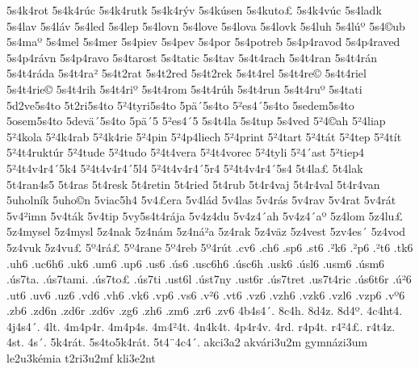 {5s4k4rot
5s4k4r^^fac
5s4k4rutk
5s4k4r^^fdv
5s4k^^fasen
5s4kuto^^a3
5s4k4v^^fac
5s4ladk
5s4lav
5s4l^^e1v
5s4led
5s4lep
5s4lovn
5s4love
5s4lova
5s4lovk
5s4luh
5s4l^^fa^^ba
5s4^^a9ub
5s4ma^^ba
5s4mel
5s4mer
5s4piev
5s4pev
5s4por
5s4potreb
5s4p4ravod
5s4p4raved
5s4p4r^^e1vn
5s4p4ravo
5s4tarost
5s4tatic
5s4tav
5s4t4rach
5s4t4ran
5s4t4r^^e1n
5s4t4r^^e1da
5s4t4ra^^b2
5s4t2rat
5s4t2red
5s4t2rek
5s4t4rel
5s4t4re^^a9
5s4t4riel
5s4t4rie^^a9
5s4t4rih
5s4t4ri^^ba
5s4t4rom
5s4t4r^^fah
5s4t4run
5s4t4ru^^ba
5s4tati
5d2ve5s4to
5t2ri5s4to
5^^b24tyri5s4to
5p^^e4^^b45s4to
5^^b2es4^^b45s4to
5sedem5s4to
5osem5s4to
5dev^^e4^^b45s4to
5p^^e4^^b45
5^^b2es4^^b45
5s4t4la
5s4tup
5s4ved
5^^b24^^a9ah
5^^b24liap
5^^b24kola
5^^b24k4rab
5^^b24k4rie
5^^b24pin
5^^b24p4liech
5^^b24print
5^^b24tart
5^^b24t^^e1t
5^^b24tep
5^^b24t^^edt
5^^b24t4rukt^^far
5^^b24tude
5^^b24tudo
5^^b24t4vera
5^^b24t4vorec
5^^b24tyli
5^^b24^^b4ast
5^^b2tiep4
5^^b24t4v4r4^^b45k4
5^^b24t4v4r4^^b45l4
5^^b24t4v4r4^^b45r4
5^^b24t4v4r4^^b45s4
5t4la^^a3
5t4lak
5t4ran4s5
5t4ras
5t4resk
5t4retin
5t4ried
5t4rub
5t4r4vaj
5t4r4val
5t4r4van
5uholn^^edk
5uho^^a9n
5viac5h4
5v4^^a3era
5v4l^^e1d
5v4las
5v4r^^e1s
5v4rav
5v4rat
5v4r^^e1t
5v4^^b2imn
5v4t^^e1k
5v4tip
5vy5s4t4r^^e1ja
5v4z4du
5v4z4^^b4ah
5v4z4^^b4a^^ba
5z4lom
5z4lu^^a3
5z4mysel
5z4mysl
5z4nak
5z4n^^e1m
5z4n^^e1^^b2a
5z4rak
5z4v^^e4z
5z4vest
5zv4es^^b4
5z4vod
5z4vuk
5z4vu^^a3
5^^ba4r^^e1^^a3
5^^ba4rane
5^^ba4reb
5^^ba4r^^fat
.cv6
.ch6
.sp6
.st6
.^^b2k6
.^^b2p6
.^^b2t6
.tk6
.uh6
.uc6h6
.uk6
.um6
.up6
.us6
.^^fas6
.usc6h6
.^^fasc6h
.usk6
.^^fasl6
.usm6
.^^fasm6
.^^fas7ta.
.^^fas7tami.
.^^fas7to^^a3
.^^fas7ti
.ust6l
.^^fast7ny
.ust6r
.^^fas7tret
.us7t4ric
.^^fas6t6r
.^^fa^^b26
.ut6
.uv6
.uz6
.vd6
.vh6
.vk6
.vp6
.vs6
.v^^b26
.vt6
.vz6
.vzh6
.vzk6
.vzl6
.vzp6
.v^^ba6
.zb6
.zd6n
.zd6r
.zd6v
.zg6
.zh6
.zm6
.zr6
.zv6
4b4s4^^b4.
8c4h.
8d4z.
8d4^^ba.
4c4ht4.
4j4s4^^b4.
4lt.
4m4p4r.
4m4p4s.
4m4^^b24t.
4n4k4t.
4p4r4v.
4rd.
r4p4t.
r4^^b24^^a3.
r4t4z.
4st.
4s^^b4.
5k4r^^e1t.
5s4to5k4r^^e1t.
5t4^^a84c4^^b4.
akci3a2
akv^^e1ri3u2m
gymn^^e1zi3um
le2u3k^^e9mia
t2ri3u2mf
kli3e2nt
}
\hyphenation {
}
%
\endgroup
\endinput
